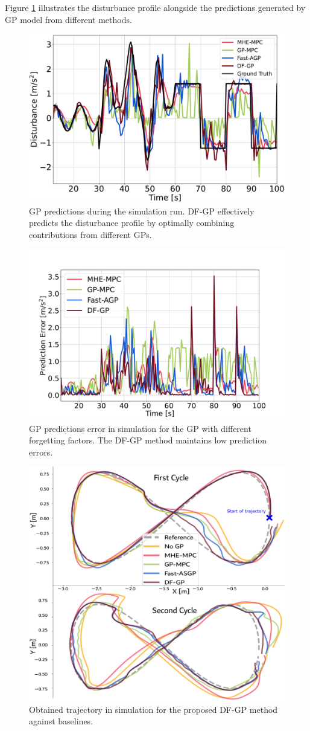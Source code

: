  Figure \ref{fig:prediction} illustrates the disturbance profile alongside the predictions generated by GP model from different methods. 
 \begin{figure}[t]
	\centering	\includegraphics[width=0.55\linewidth]{figures/pred_mhe.pdf}
	\caption{\ac{GP} predictions during the simulation run. \ac{DF-GP} effectively predicts the disturbance profile by optimally combining contributions from different \ac{GP}s.}
	\label{fig:prediction}
\end{figure}
%
\begin{figure}[b]
	\centering	\includegraphics[width=0.55\linewidth]{figures/pred_err_mhe.pdf}
	\caption{\ac{GP} predictions error in simulation for the \ac{GP} with different forgetting factors. The \ac{DF-GP} method maintains low prediction errors. }
	\label{fig:pred_error}
\end{figure}
 \begin{figure}[t]
	\centering
	\includegraphics[width=0.7\linewidth]{figures/lem_mhe.pdf}
	\caption{Obtained trajectory in simulation for the proposed \ac{DF-GP} method against baselines. }%
	\label{fig:traj}
\end{figure}
